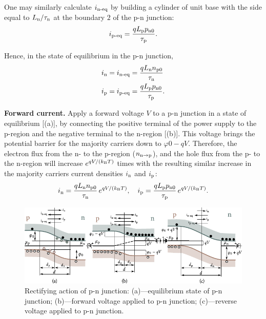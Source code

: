 One may similarly calculate $i_{\text{n-eq}}$ by building a cylinder of unit base with the side equal to $L_{\text{n}}/\tau_{\text{n}}$ at the boundary $2$ of the p-n junction:
\begin{equation}\label{eq:8_25}
	i_{\text{p-eq}} = \frac{q L_{\text{p}} p_{\text{n$0$}}}{\tau_{\text{p}}}.
\end{equation}

Hence, in the state of equilibrium in the p-n junction,
\begin{equation}\label{eq:8_26}
	\begin{split}
		i_{\text{n}} &= i_{\text{n-eq}} = \frac{q L_{\text{n}} n_{\text{p$0$}}}{\tau_{\text{n}}}\\
		i_{\text{p}} &= i_{\text{p-eq}} = \frac{q L_{\text{p}} p_{\text{n$0$}}}{\tau_{\text{p}}}.
	\end{split}
\end{equation}

\textbf{Forward current.} Apply a forward voltage $V$ to a p-n junction in a state of equilibrium [(a)], by connecting the positive terminal of the power supply to the p-region and the negative terminal to the n-region [(b)]. This voltage brings the potential barrier for the majority carriers down to $\varphi0-qV$. Therefore, the electron flux from the n- to the p-region ($n_{\text{n$\to$p}}$), and the hole flux from the p- to the n-region will increase $e^{qV/(k_{\text{B}}T)}$ times with the resulting similar increase in the majority carriers current densities $i_{\text{n}}$ and $i_{\text{p}}$:
\begin{equation*}
	i_{\text{n}} = \frac{qL_{\text{n}} n_{\text{p$0$}}}{\tau_{\text{n}}}\, e^{qV/(k_{\text{B}}T)},\quad i_{\text{p}} = \frac{qL_{\text{p}} p_{\text{n$0$}}}{\tau_{\text{p}}}\, e^{qV/(k_{\text{B}}T)}.
\end{equation*}

\begin{figure}[t]
	\begin{center}
		\includegraphics[scale=1.0]{figures/ch_08/fig_8_14.pdf}
		\caption[]{Rectifying action of p-n junction: (a)---equilibrium state of p-n junction; (b)---forward voltage applied to p-n junction; (c)---reverse voltage applied to p-n junction.}
		\label{fig:8_14}
	\end{center}
	\vspace{-0.8cm}
\end{figure}

